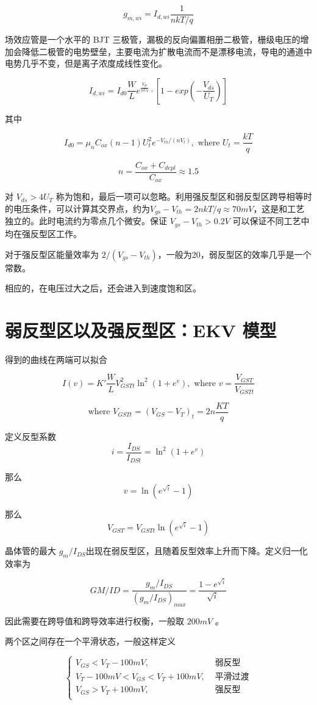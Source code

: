 \documentclass[cn,11pt,chinese,black,simple]{../elegantbook}
\begin{document}
\[g_{m,wi} = I_{d,wi} \frac{1}{n k T / q}\]

场效应管是一个水平的 BJT 三极管，漏极的反向偏置相册二极管，栅级电压的增加会降低二极管的电势壁垒，主要电流为扩散电流而不是漂移电流，导电的通道中电势几乎不变，但是离子浓度成线性变化。

\[I_{d,wi} = I_{d0} \frac{W}{L} e^{\frac{V_{gs}}{nU_T}} \cdot \left[1 - exp(-\frac{V_{ds}}{U_T})\right]\] 

其中 

\[I_{d0} = \mu_n C_{ox} (n - 1) U_t^2 e^{-V_{th}/(nV_t)}, \text{ where } U_t = \frac{kT}{q}\]

\[n = \frac{C_{ox} + C_{depl}}{C_{ox}}\approx 1.5\]

对 \(V_{ds} > 4 U_T\) 称为饱和，最后一项可以忽略。利用强反型区和弱反型区跨导相等时的电压条件，可以计算其交界点，约为\(V_{gs}-V_{th} = 2 n k T / q \approx 70 mV \)，这是和工艺独立的。此时电流约为零点几个微安。保证 \(V_{gs} - V_{th} > 0.2 V\) 可以保证不同工艺中均在强反型区工作。

对于强反型区能量效率为 \(2 / (V_{gs}-V_{th})\)，一般为20，弱反型区的效率几乎是一个常数。

相应的，在电压过大之后，还会进入到速度饱和区。

\section{弱反型区以及强反型区：EKV 模型}

得到的曲线在两端可以拟合

\[I(v) = K' \frac{W}{L} V_{GSTt}^2 \ln^2(1 + e^v), \text{ where } v = \frac{V_{{GST}}}{V_{GSTt}}\]

\[\text{where } V_{GSTt} = (V_{GS}-V_T)_t = 2n\frac{KT}{q}\]

定义反型系数\[i = \frac{I_{DS}}{I_{DSt}} = \ln^2(1+e^v)\]

那么\[v = \ln(e^{\sqrt{i}}-1)\]

那么\[V_{GST}=V_{GSTt} \ln(e^{\sqrt{i}}-1) \]

晶体管的最大 \(g_m/I_{DS}\)出现在弱反型区，且随着反型效率上升而下降。定义归一化效率为

\[GM/ID = \frac{g_m/I_{DS}}{(g_m/I_{DS})_{max}} = \frac{1-e^{\sqrt{i}}}{\sqrt{i}}\]

因此需要在跨导值和跨导效率进行权衡，一般取 \(200 mV\) 。

两个区之间存在一个平滑状态，一般这样定义

\[\left\{\begin{aligned}
    V_{GS} < V_{T} - 100 mV, &\text{ 弱反型}\\
    V_{T} - 100 mV < V_{GS} < V_{T} + 100 mV, &\text{ 平滑过渡}\\
    V_{GS} > V_{T} + 100 mV, &\text{ 强反型}\\
\end{aligned}\right.\]
\end{document}
